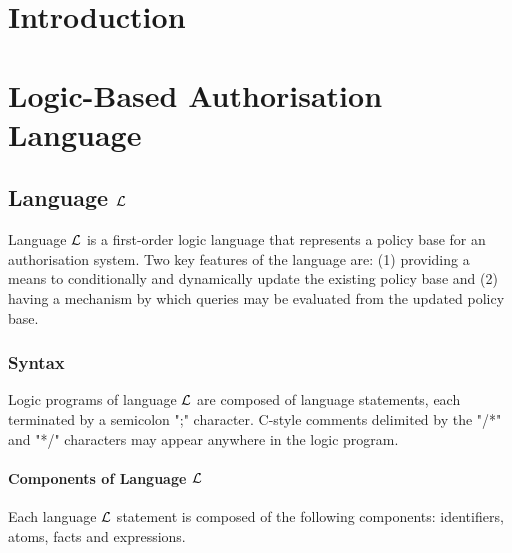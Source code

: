 \documentclass[11pt]{report}
\begin{document}
  \onehalfspacing

  \tableofcontents

  \chapter{Introduction}

  \chapter{Logic-Based Authorisation Language}

    \section{Language $\cal{L}$}
      \label{sec-langl}

      Language $\cal{L}$ is a first-order logic language that represents a
      policy base for an authorisation system. Two key features of the
      language are: (1) providing a means to conditionally and dynamically
      update the existing policy base and (2) having a mechanism by which
      queries may be evaluated from the updated policy base.

      \subsection{Syntax}
        \label{subsect-langl-syntax}

        Logic programs of language ${\cal L}$ are composed of language
        statements, each terminated by a semicolon ";" character. C-style
        comments delimited by the "/*" and "*/" characters may appear anywhere
        in the logic program.
   
        \subsubsection{Components of Language $\cal{L}$}

          Each language ${\cal L}$ statement is composed of the following
          components: identifiers, atoms, facts and expressions.
   
\end{document}
